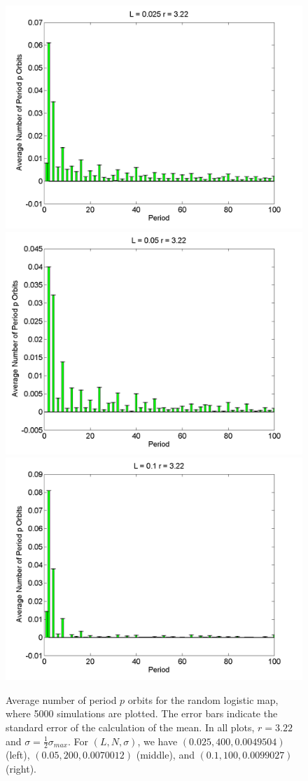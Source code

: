\begin{figure}[H]\linespread{1}
\caption[Average number of period $p$ orbits for the random logistic
map, $\sigma=\frac{1}{2}\sigma_{max}$ and $r=3.22$]{Average number of period $p$ orbits for the random logistic
map, where 5000 simulations are plotted. The error bars indicate
the standard error of the calculation of the mean. In all plots,
$r=3.22$ and $\sigma=\frac{1}{2}\sigma_{max}$. For $(L,N,\sigma)$,
we have $(0.025, 400, 0.0049504)$ (left), $(0.05, 200, 0.0070012)$
(middle), and $(0.1, 100, 0.0099027)$ (right).}\label{fig:rloghist_hs}
	\begin{center}
\includegraphics[width=.33\textwidth]{figs/rlog_hist_hs_L_0025_r_322_s_00049504_a_30632e-07_sims_5000.png}\hfill		\includegraphics[width=.33\textwidth]{figs/rlog_hist_hs_L_005_r_322_s_00070012_a_12252e-06_sims_5000.png}\hfill
\includegraphics[width=.33\textwidth]{figs/rlog_hist_hs_L_01_r_322_s_00099027_a_48991e-06_sims_5000.png}
	\end{center}
\end{figure}

